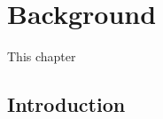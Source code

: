 

\endofdump

\ifRootBuild\else
  
  \makeglossaries
\fi





\newcommand\chapref[2]{\hyperref[#1]{#2.\ref{#1}}}

\chapter{Background}

This chapter 

{

\newcommand\bmat[1]{\begin{bmatrix}#1\end{bmatrix}}
\renewcommand*\eR{\mat{\hat R}}
\renewcommand\1{\vec 1}

\section{Introduction}

}
